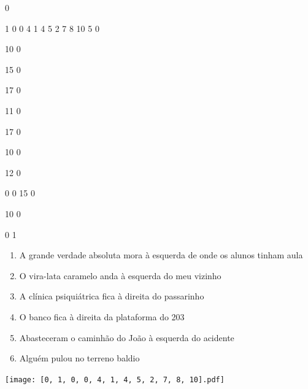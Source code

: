 \documentclass[12pt]{article}
\begin{document}
		\vfill  
		  
{
	0	%

	1	%
	0	%
	0	%
	4	%
	1	%
	4	%
	5	%
	2	%
	7	%
	8	%
	10	%
	5	%
	0	%

	10	%
	0	%

	15	%
	0	%

	17	%
	0	%

	11	%
	0	%

	17	%
	0	%

	10	%
	0	%

	12	%
	0	%

	0	%
	0	%
	15	%
	0	%

	10	%
	0	%

	0	%
	1	%
}	  
		    	

		 

\pagebreak


	\begin{enumerate}
		  \sffamily %
		  \large %


\vfill \item
A grande verdade absoluta mora	%
à esquerda
de onde os alunos tinham aula	%

\vfill \item
O vira-lata caramelo anda	%
à esquerda
do meu vizinho	%

\vfill \item
A clínica psiquiátrica fica	%
à direita
do passarinho	%

\vfill \item
O banco fica	%
à direita
da plataforma do 203	%

\vfill \item
Abasteceram o caminhão do João	%
à esquerda
do acidente	%

\vfill \item
Alguém pulou	%
no terreno baldio	%
	\end{enumerate}
		  
		  \hfill

		  \vfill

\texttt{[image: [0, 1, 0, 0, 4, 1, 4, 5, 2, 7, 8, 10].pdf]}


	\hfill	  	  
\end{document}
